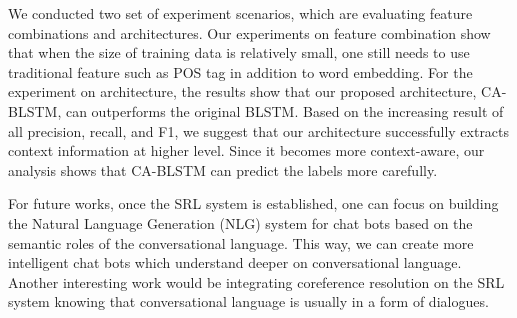 We conducted two set of experiment scenarios, which are evaluating feature combinations and architectures. Our experiments on feature combination show that when the size of training data is relatively small, one still needs to use traditional feature such as POS tag in addition to word embedding. For the experiment on architecture, the results show that our proposed architecture, CA-BLSTM, can outperforms the original BLSTM. Based on the increasing result of all precision, recall, and F1, we suggest that our architecture successfully extracts context information at higher level. Since it becomes more context-aware, our analysis shows that CA-BLSTM can predict the labels more carefully.

For future works, once the SRL system is established, one can focus on building the Natural Language Generation (NLG) system for chat bots based on the semantic roles of the conversational language. This way, we can create more intelligent chat bots which understand deeper on conversational language. Another interesting work would be integrating coreference resolution on the SRL system knowing that conversational language is usually in a form of dialogues.

